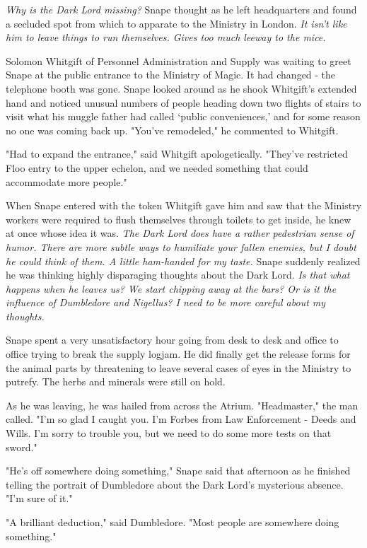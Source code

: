 \emph{Why is the Dark Lord missing?} Snape thought as he left headquarters and found a secluded spot from which to apparate to the Ministry in London. \emph{It isn't like him to leave things to run themselves. Gives too much leeway to the mice.}

Solomon Whitgift of Personnel Administration and Supply was waiting to greet Snape at the public entrance to the Ministry of Magic. It had changed - the telephone booth was gone. Snape looked around as he shook Whitgift's extended hand and noticed unusual numbers of people heading down two flights of stairs to visit what his muggle father had called `public conveniences,' and for some reason no one was coming back up. "You've remodeled," he commented to Whitgift.

"Had to expand the entrance," said Whitgift apologetically. "They've restricted Floo entry to the upper echelon, and we needed something that could accommodate more people."

When Snape entered with the token Whitgift gave him and saw that the Ministry workers were required to flush themselves through toilets to get inside, he knew at once whose idea it was. \emph{The Dark Lord does have a rather pedestrian sense of humor. There are more subtle ways to humiliate your fallen enemies, but I doubt he could think of them. A little ham-handed for my taste.} Snape suddenly realized he was thinking highly disparaging thoughts about the Dark Lord. \emph{Is that what happens when he leaves us? We start chipping away at the bars? Or is it the influence of Dumbledore and Nigellus? I need to be more careful about my thoughts.}

Snape spent a very unsatisfactory hour going from desk to desk and office to office trying to break the supply logjam. He did finally get the release forms for the animal parts by threatening to leave several cases of eyes in the Ministry to putrefy. The herbs and minerals were still on hold.

As he was leaving, he was hailed from across the Atrium. "Headmaster," the man called. "I'm so glad I caught you. I'm Forbes from Law Enforcement - Deeds and Wills. I'm sorry to trouble you, but we need to do some more tests on that sword."

\sbreak

"He's off somewhere doing something," Snape said that afternoon as he finished telling the portrait of Dumbledore about the Dark Lord's mysterious absence. "I'm sure of it."

"A brilliant deduction," said Dumbledore. "Most people are somewhere doing something."


